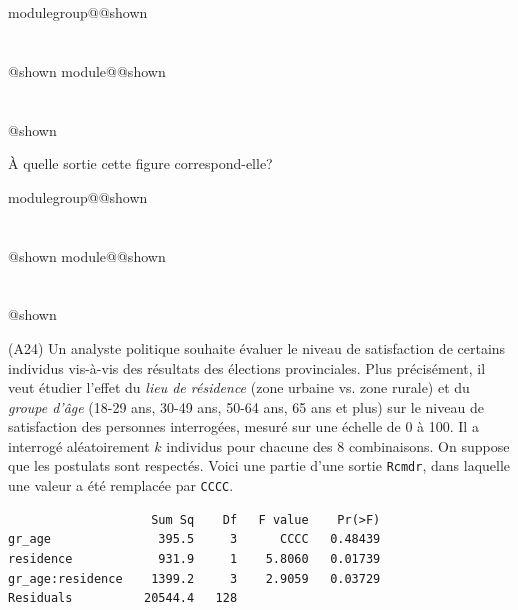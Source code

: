 \documentclass{Evaluation}
\makeatletter
\newcommand{\currentmodulekey}{}
\newcommand{\currentmoduletitle}{}
\newcommand{\currentgroupkey}{}
\newcommand{\currentgrouptitle}{}
\newcommand{\showmoduleifneeded}{%
  \ifx\currentgroupkey\empty\else
    \expandafter\ifx\csname modulegroup@\currentgroupkey @shown\endcsname\relax
      \section*{\currentgrouptitle}%
      \expandafter\gdef\csname modulegroup@\currentgroupkey @shown\endcsname{1}%
    \fi
  \fi
  \expandafter\ifx\csname module@\currentmodulekey @shown\endcsname\relax
    \section*{\currentmoduletitle}%
    \expandafter\gdef\csname module@\currentmodulekey @shown\endcsname{1}%
  \fi
}
\newenvironment{A24}{\showmoduleifneeded}{}
\makeatother
\begin{document}
\begin{questions}
\begin{A24}
À quelle sortie cette figure correspond-elle?  
    
    \medskip\begin{oneparcheckboxes}
    \end{oneparcheckboxes}
\end{A24}

\begin{A24}
\question
(A24) 
Un analyste politique souhaite évaluer le niveau de satisfaction de certains individus vis-à-vis des résultats des élections provinciales. Plus précisément, il veut étudier l'effet du \textit{lieu de résidence} (zone urbaine vs. zone rurale) et du \textit{groupe d'âge} (18-29 ans, 30-49 ans, 50-64 ans, 65 ans et plus) sur le niveau de satisfaction des personnes interrogées, mesuré sur une échelle de 0 à 100. Il a interrogé aléatoirement $k$ individus pour chacune des 8 combinaisons. On suppose que les postulats sont respectés. Voici une partie d’une sortie \texttt{Rcmdr}, dans laquelle une valeur a été remplacée par \texttt{CCCC}.
\begin{verbatim}
                    Sum Sq    Df   F value    Pr(>F)  
gr_age               395.5     3      CCCC   0.48439  
residence            931.9     1    5.8060   0.01739 
gr_age:residence    1399.2     3    2.9059   0.03729 
Residuals          20544.4   128 
\end{verbatim}

\end{A24}
\end{questions}
\end{document}
